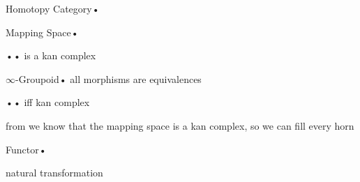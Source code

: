 \begin{definition}{Homotopy Category}{•}

\end{definition}




\begin{definition}{Mapping Space}{•}

\end{definition}


\begin{prop}{•}{•}
is a kan complex
\end{prop}
\begin{proof-prop}







\end{proof-prop}




\begin{definition}{$\infty$-Groupoid}{•}
all morphisms are equivalences
\end{definition}


\begin{prop}{•}{•}
iff kan complex
\end{prop}
\begin{proof-prop}


from 
we know that the mapping space is a kan complex, so we can fill every horn 



\end{proof-prop}







\begin{definition}{Functor}{•}

natural transformation
\end{definition}











